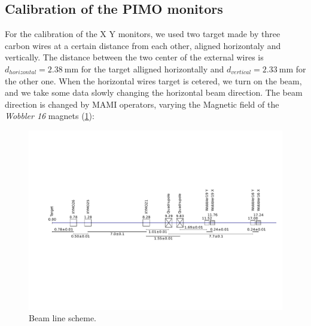 {\subsection{Calibration of the PIMO monitors}

For the calibration of the X Y monitors, we used two target made by three carbon wires at a certain distance from each other, aligned horizontaly and vertically. The distance between the two center of the external wires is $ d_{horizontal} = \SI{2.38}{\milli \meter}$ for the target alligned horizontally and $d_{vertical} = \SI{2.33}{\milli \meter}$ for the other one.
When the horizontal wires target is cetered, we turn on the beam, and we take some data slowly changing the horizontal beam direction. The beam direction is changed by MAMI operators, varying the Magnetic field of the \textit{Wobbler 16} magnets (\ref{fig:BeamLine}):

\begin{figure}[hbtp]
\centering
\includegraphics[scale=0.4]{figures/XYMOCalibBeamLine.svg.pdf}
\caption{Beam line scheme.}
\label{fig:BeamLine}
\end{figure}


}

